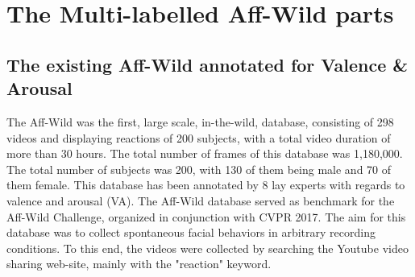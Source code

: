 \documentclass[a4paper, 10pt, conference]{ieeeconf}      %
\begin{document}
\begin{comment}
\begin{figure}[h]
   \centering
      \texttt{[image: AU\_total\_dist.png]}
      \caption{Pie chart of the distribution of Action Units in whole dataset}
      \label{fig:au_total_dist}
\end{figure} 


\begin{figure}[h]
\begin{tabular}{cc}
  \texttt{[image: au1\_va.png]} &   \texttt{[image: au2\_va.png]} \\
 \texttt{[image: au4\_va.png]} &   \texttt{[image: au6\_va.png]} \\
   \texttt{[image: au12\_va.png]} &   \texttt{[image: au15\_va.png]} \\
 \texttt{[image: au20\_va.png]} &   \texttt{[image: au25\_va.png]} 
\end{tabular}
\caption{Graphs of the distribution of each Action Unit in the VA-Space}
\label{fig:au_dist_va}
\end{figure}


\begin{figure}
    \centering
    \texttt{[image: annotation\_software.png]}
    \caption{The GUI for the Action Unit annotation software. The GUI for the basic expression software was exactly the same; their difference  being the titles in the annotation tabs}
    \label{fig:annotation_interface}
\end{figure}
\end{comment}






\section{The Multi-labelled  Aff-Wild parts}


\subsection{The existing Aff-Wild annotated for  Valence \& Arousal}


The Aff-Wild was the first, large scale, in-the-wild, database, consisting of 298 videos and displaying reactions
of 200 subjects, with a total video duration of more than 30 hours. The total number of frames of this database was 1,180,000. The total number of subjects was 200, with 130 of them being male and 70 of them female.
This database has been annotated by 8 lay experts with regards to valence and arousal (VA). The Aff-Wild database served as benchmark for the Aff-Wild Challenge, organized in conjunction with CVPR 2017. The aim for this database was to collect spontaneous facial behaviors in arbitrary recording conditions. To
this end, the videos were collected by searching the Youtube video sharing web-site, mainly with the "reaction" keyword. 
\end{document}
